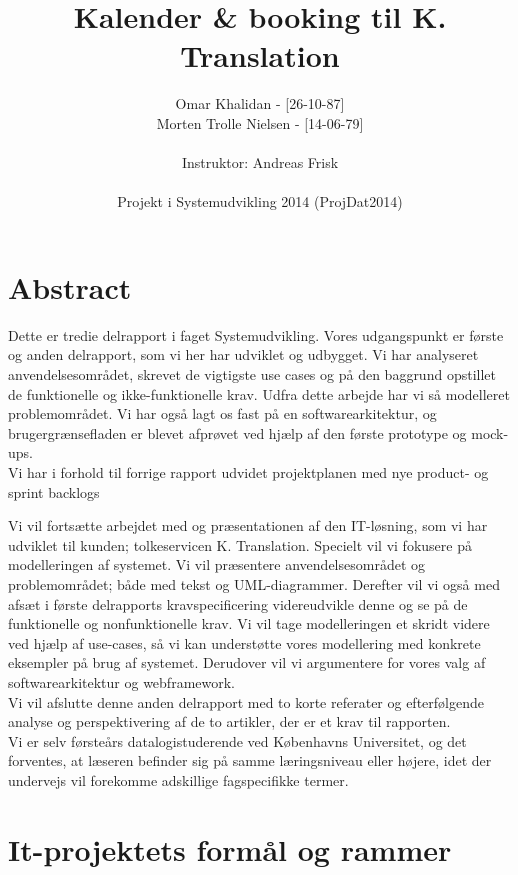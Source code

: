 \documentclass[12pt]{article}   %
\title{Kalender \& booking til K. Translation}
\author{Omar Khalidan - [26-10-87]\\
     Morten Trolle Nielsen - [14-06-79]\\ \\
    Instruktor: Andreas Frisk\\ \\
Projekt i Systemudvikling 2014 (ProjDat2014)}
\begin{document}
\maketitle
\thispagestyle{empty}
\newpage
\tableofcontents
\newpage

\section{Abstract}
Dette er tredie delrapport i faget Systemudvikling. Vores udgangspunkt er første og anden delrapport, som vi her har udviklet og udbygget. Vi har analyseret anvendelsesområdet, skrevet de vigtigste use cases og på den baggrund opstillet de funktionelle og ikke-funktionelle krav. Udfra dette arbejde har vi så modelleret problemområdet. Vi har også lagt os fast på en softwarearkitektur, og brugergrænsefladen er blevet afprøvet ved hjælp af den første prototype og mock-ups. \\
Vi har i forhold til forrige rapport udvidet projektplanen med nye product- og sprint backlogs


Vi vil fortsætte arbejdet med og
præsentationen af den IT-løsning, som vi har udviklet til kunden; tolkeservicen
K. Translation. Specielt vil vi fokusere på modelleringen af systemet. Vi vil 
præsentere anvendelsesområdet og problemområdet; både med tekst og UML-diagrammer.
Derefter vil vi også med afsæt i første delrapports kravspecificering videreudvikle
denne og se på de funktionelle og nonfunktionelle krav. Vi vil tage modelleringen
et skridt videre ved hjælp af use-cases, så vi kan understøtte vores modellering med
konkrete eksempler på brug af systemet. Derudover vil vi argumentere for vores
valg af softwarearkitektur og webframework. \\
Vi vil afslutte denne anden delrapport med to korte referater og efterfølgende
analyse og perspektivering af de to artikler, der er et krav til rapporten.\\
Vi er selv førsteårs datalogistuderende ved Københavns Universitet, og det
forventes, at læseren befinder sig på samme læringsniveau eller højere, idet
der undervejs vil forekomme adskillige fagspecifikke termer. 

\newpage

\section{It-projektets formål og rammer}
\end{document}
